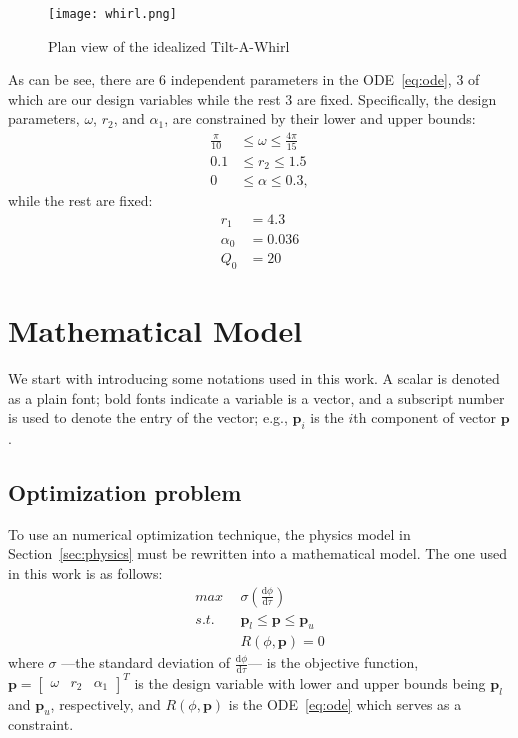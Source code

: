 \documentclass[a4paper]{article}
\makeatletter
\newcommand{\diff}[0]{\mathrm{d}}
\newcommand{\eg}[0]{{e.g.\@}\xspace}
\makeatother
\begin{document}
\begin{figure}[!htbp]
  \centering
  \texttt{[image: whirl.png]}
  \caption{Plan view of the idealized Tilt-A-Whirl~\cite{doi:10.1119/1.17742}}
  \label{fig:plan_view}
\end{figure}
As can be see, there are $6$ independent parameters in the ODE~\eqref{eq:ode}, 3 of which are our design variables while the rest 3 are fixed. Specifically, the design parameters, $\omega$, $r_2$, and $\alpha_1$, are constrained by their lower and upper bounds: 
  \begin{equation}
  \begin{aligned}
  \frac{\pi}{10} &\le \omega \le \frac{4\pi}{15} \\
  0.1 &\le r_2 \le 1.5 \\
  0 &\le \alpha \le 0.3,
  \end{aligned}
  \end{equation}
while the rest are fixed:
\begin{equation}
\begin{aligned}
r_1 &= 4.3 \\
\alpha_0 &= 0.036 \\
Q_0 &= 20
\end{aligned}
\end{equation}

\section{Mathematical Model}
We start with introducing some notations used in this work. A scalar is denoted as a plain font; bold fonts indicate a variable is a vector, and a subscript number is used to denote the entry of the vector; \eg, $\bm{p}_i$ is the $i$th component of vector $\bm{p}$.

\subsection{Optimization problem}
To use an numerical optimization technique, the physics model in Section~\ref{sec:physics} must be rewritten into a mathematical model. The one used in this work is as follows:
\begin{equation} \label{eq:math_model_1}
\begin{aligned}
max\:\: &\sigma(\frac{\diff\phi}{\diff\tau}) \\
s.t.\:\: &\bm{p}_l \le \bm{p} \le \bm{p}_u\\
         &R(\phi, \bm{p}) = 0
\end{aligned}
\end{equation}
where $\sigma$ ---the standard deviation of $\frac{\diff\phi}{\diff \tau}$--- is the objective function, $\bm{p} = \begin{bmatrix}\omega & r_2 & \alpha_1\end{bmatrix}^T$ is the design variable with lower and upper bounds being $\bm{p}_l$ and $\bm{p}_u$, respectively, and $R(\phi, \bm{p})$ is the ODE~\eqref{eq:ode} which serves as a constraint. 
\end{document}
